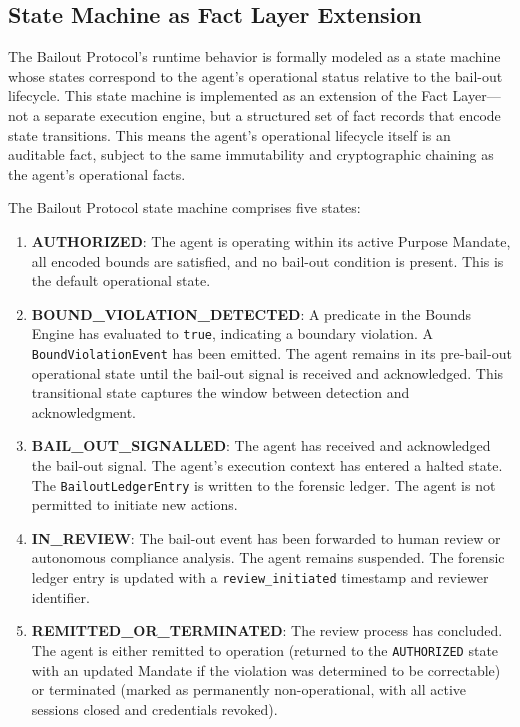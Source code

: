 \subsection{State Machine as Fact Layer Extension}
\label{subsection:bailout-state-machine}

The Bailout Protocol's runtime behavior is formally modeled as a state machine whose states correspond to the agent's operational status relative to the bail-out lifecycle. This state machine is implemented as an extension of the Fact Layer—not a separate execution engine, but a structured set of fact records that encode state transitions. This means the agent's operational lifecycle itself is an auditable fact, subject to the same immutability and cryptographic chaining as the agent's operational facts.

The Bailout Protocol state machine comprises five states:

\begin{enumerate}
  \item \textbf{AUTHORIZED}: The agent is operating within its active Purpose Mandate, all encoded bounds are satisfied, and no bail-out condition is present. This is the default operational state.
  \item \textbf{BOUND\_VIOLATION\_DETECTED}: A predicate in the Bounds Engine has evaluated to \texttt{true}, indicating a boundary violation. A \texttt{BoundViolationEvent} has been emitted. The agent remains in its pre-bail-out operational state until the bail-out signal is received and acknowledged. This transitional state captures the window between detection and acknowledgment.
  \item \textbf{BAIL\_OUT\_SIGNALLED}: The agent has received and acknowledged the bail-out signal. The agent's execution context has entered a halted state. The \texttt{BailoutLedgerEntry} is written to the forensic ledger. The agent is not permitted to initiate new actions.
  \item \textbf{IN\_REVIEW}: The bail-out event has been forwarded to human review or autonomous compliance analysis. The agent remains suspended. The forensic ledger entry is updated with a \texttt{review\_initiated} timestamp and reviewer identifier.
  \item \textbf{REMITTED\_OR\_TERMINATED}: The review process has concluded. The agent is either remitted to operation (returned to the \texttt{AUTHORIZED} state with an updated Mandate if the violation was determined to be correctable) or terminated (marked as permanently non-operational, with all active sessions closed and credentials revoked).
\end{enumerate}

